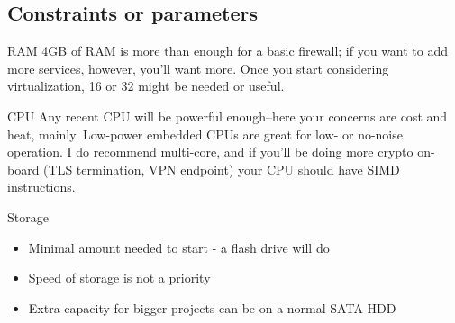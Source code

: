 \documentclass[bigger,aspectratio=169]{beamer}
\begin{document}
\subsection{Constraints or parameters}
\label{sec:org9880863}

\begin{frame}[label={sec:org4c417ad}]{RAM}
4GB of RAM is more than enough for a basic firewall; if you want to add more
services, however, you'll want more. Once you start considering
virtualization, 16 or 32 might be needed or useful.
\end{frame}

\begin{frame}[label={sec:org5a31146}]{CPU}
Any recent CPU will be powerful enough--here your concerns are cost and
heat, mainly. Low-power embedded CPUs are great for low- or no-noise
operation. I do recommend multi-core, and if you'll be doing more crypto
on-board (TLS termination, VPN endpoint) your CPU should have SIMD
instructions.
\end{frame}

\begin{frame}[label={sec:org7599d13}]{Storage}
  \begin{itemize}
  \item<2-> Minimal amount needed to start - a flash drive will do
  \item<3-> Speed of storage is not a priority
  \item<4-> Extra capacity for bigger projects can be on a normal SATA HDD
  \end{itemize}
\end{frame}
\end{document}
